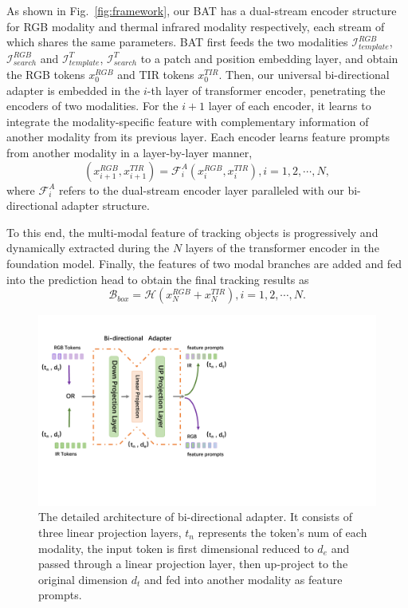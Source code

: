 \documentclass[letterpaper]{article} %
\begin{document}
As shown in Fig.~\ref{fig:framework}, our BAT has a dual-stream encoder structure for RGB modality and thermal infrared modality respectively, each stream of which shares the same parameters. BAT first feeds the two modalities $\mathcal{I}_{template}^{RGB}$, $\mathcal{I}_{search}^{RGB}$ and $\mathcal{I}_{template}^{T}$, $\mathcal{I}_{search}^{T}$ to a patch and position embedding layer, and obtain the RGB tokens $x^{RGB}_0$ and TIR tokens $x^{TIR}_0$. Then, our universal bi-directional adapter is embedded in the $i$-th layer of transformer encoder, penetrating the encoders of two modalities. For the $i+1$ layer of each encoder, it learns to integrate the modality-specific feature with complementary information of another modality from its previous layer.  Each encoder learns feature prompts from another modality in a layer-by-layer manner,
\begin{equation}
    (x_{i+1}^{RGB},x_{i+1}^{TIR}) = \mathcal{F}_i^{A}( x_{i}^{RGB}, x_{i}^{TIR}),              i = 1, 2, \cdots, N,
\end{equation}
where $\mathcal{F}_i^{A}$ refers to the dual-stream encoder layer paralleled with our bi-directional adapter structure.

To this end, the multi-modal feature of tracking objects is progressively and dynamically extracted during the $N$ layers of the transformer encoder in the foundation model.
Finally, the features of two modal branches are added and fed into the prediction head to obtain the final tracking results as
\begin{equation}
    \mathcal{B}_{box} = \mathcal{H}(x_{N}^{RGB} + x_{N}^{TIR}), i = 1, 2, \cdots, N.
\end{equation}


\begin{figure}[ht]
\centering
\includegraphics[width=1\columnwidth]{Figures/Figure3.pdf}
\caption{The detailed architecture of bi-directional adapter. 
It consists of three linear projection layers, $t_{n}$ represents the token's num of each modality, the input token is first dimensional reduced to $d_{e}$ and passed through a linear projection layer, then up-project to the original dimension $d_{t}$ and fed into another modality as feature prompts.
}
\label{fig:adapter}
\end{figure}
\end{document}

